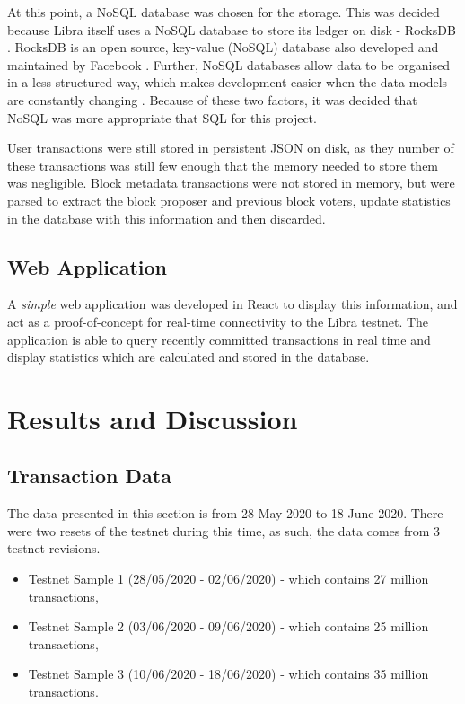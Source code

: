 \documentclass[12pt,openany,a4paper]{book}
\begin{document}
At this point, a NoSQL database was chosen for the storage. This was decided because 
Libra itself uses a NoSQL database to store its ledger on disk - RocksDB \cite{libra_storage}.
RocksDB is an open source, key-value (NoSQL) database also developed and maintained by Facebook
\cite{rocksdb}. Further, NoSQL databases allow data to be organised in a less structured way,
which makes development easier when the data models are constantly changing \cite{nosql_2, nosql_advantages}.
Because of these two factors, it was decided that NoSQL was more appropriate that SQL for this 
project.

User transactions were still stored in persistent JSON on disk, as they number 
of these transactions was still few enough that the memory needed to store them 
was negligible. Block metadata transactions were not stored in memory, but were parsed to
extract the block proposer and previous block voters, update statistics in the 
database with this information and then discarded.

\section{Web Application}
\label{web_app}
A \textit{simple} web application was developed in React to display this 
information, and act as a proof-of-concept for real-time connectivity to the Libra
testnet. The application is able to query recently committed transactions in real time
and display statistics which are calculated and stored in the database.

\chapter{Results and Discussion}
\label{result_disc}
\section{Transaction Data}
\label{results:tx_data}
The data presented in this section is from 28 May 2020 to 18 June 2020. 
There were two resets of the testnet during this time, as such, the data comes 
from 3 testnet revisions.
\begin{itemize}
    \item Testnet Sample 1 (28/05/2020 - 02/06/2020) - which contains 27 million transactions,
    \item Testnet Sample 2 (03/06/2020 - 09/06/2020) - which contains 25 million transactions,
    \item Testnet Sample 3 (10/06/2020 - 18/06/2020) - which contains 35 million transactions.
\end{itemize}
\end{document}

